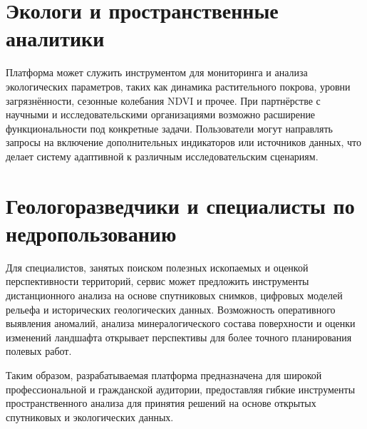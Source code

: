 \section*{Экологи и пространственные аналитики}

Платформа может служить инструментом для мониторинга и анализа экологических параметров, таких как динамика растительного покрова, уровни загрязнённости, сезонные колебания NDVI и прочее. При партнёрстве с научными и исследовательскими организациями возможно расширение функциональности под конкретные задачи. Пользователи могут направлять запросы на включение дополнительных индикаторов или источников данных, что делает систему адаптивной к различным исследовательским сценариям.

\section*{Геологоразведчики и специалисты по недропользованию}

Для специалистов, занятых поиском полезных ископаемых и оценкой перспективности территорий, сервис может предложить инструменты дистанционного анализа на основе спутниковых снимков, цифровых моделей рельефа и исторических геологических данных. Возможность оперативного выявления аномалий, анализа минералогического состава поверхности и оценки изменений ландшафта открывает перспективы для более точного планирования полевых работ.

Таким образом, разрабатываемая платформа предназначена для широкой профессиональной и гражданской аудитории, предоставляя гибкие инструменты пространственного анализа для принятия решений на основе открытых спутниковых и экологических данных.
